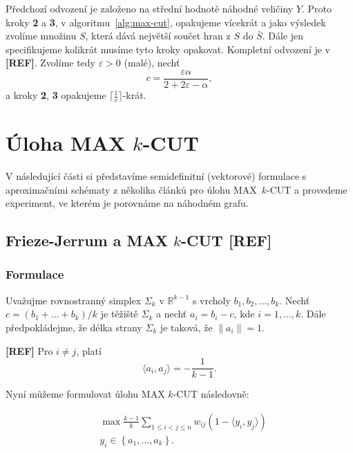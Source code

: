 Předchozí odvození je založeno na střední hodnotě náhodné veličiny $Y$. Proto kroky \textbf{2} a \textbf{3}, v algoritmu~\ref{alg:max-cut}, opakujeme vícekrát a jako výsledek zvolíme množinu $S$, která dává největší součet hran z $S$ do $\bar{S}$. Dále jen specifikujeme kolikrát musíme tyto kroky opakovat. Kompletní odvození je v \textbf{[REF]}. Zvolíme tedy $\varepsilon > 0$ (malé), nechť
$$
    c = \frac{\varepsilon \alpha}{2 + 2\varepsilon - \alpha},
$$
a kroky \textbf{2}, \textbf{3} opakujeme $\lceil \frac{1}{c} \rceil$-krát.


\section{Úloha MAX $k$-CUT}

V následující části si představíme semidefinitní (vektorové) formulace s aproximačními schématy z několika článků pro úlohu MAX~$k$-CUT a provedeme experiment, ve kterém je porovnáme na náhodném grafu.

\subsection{Frieze-Jerrum a MAX $k$-CUT \textbf{[REF]}}

\subsubsection*{Formulace}

Uvažujme rovnostranný simplex $\Sigma_k$ v $\mathbb{R}^{k-1}$ s vrcholy $b_1, b_2, \dots, b_k$. Nechť $c = (b_1 + \dots + b_k) / k$ je těžiště $\Sigma_k$ a nechť $a_i = b_i - c$, kde $i = 1, \dots, k$. Dále předpokládejme, že délka strany $\Sigma_k$ je taková, že $\| a_i\| = 1$.

\begin{lm}\textbf{[REF]}
    Pro $i \neq j$, platí
    $$
        \langle a_i, a_j \rangle = -\frac{1}{k-1}.
    $$
\end{lm}

\noindent Nyní můžeme formulovat úlohu MAX $k$-CUT následovně:

\begin{equation}\tag{FJ}
    \begin{split}
        &\max \frac{k-1}{k} \sum_{1 \leq i < j \leq n} w_{ij} (1 - \langle y_i, y_j \rangle) \\
        &y_i \in \left\{ a_1, \dots, a_k \right\}.
    \end{split}
    \label{eq:FJ}
\end{equation}


